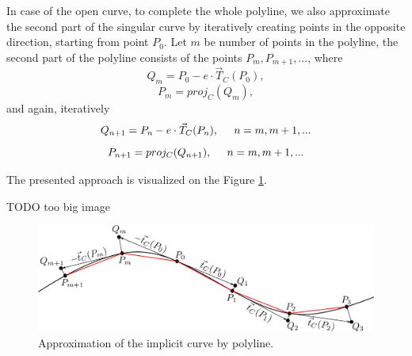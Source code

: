 In case of the open curve, to complete the whole polyline, we also approximate 
the second part of the singular curve by iteratively creating points in the 
opposite direction, starting from point $P_0$. Let $m$ be number of points
in the polyline, the second part of the polyline consists of the points
$P_m, P_{m+1}, ...$, where
$$Q_m = P_0 - e \cdot \vec{T}_C(P_0),$$
$$P_m = proj_C(Q_m),$$
and again, iteratively
$$Q_{n+1} = P_n - e \cdot \vec{T}_C(P_{n}), \hspace{5mm} n = m, m+1, ...$$
$$P_{n+1} = proj_C(Q_{n+1}), \hspace{5mm} n = m, m+1, ...$$

The presented approach is visualized on the Figure \ref{img:37}.

TODO too big image
\begin{figure}
    \centerline{\includegraphics[scale=0.5]{images/img37}}
    \caption[Approximation of the implicit curve by polyline]
    {Approximation of the implicit curve by polyline.}
    \label{img:37}
\end{figure}

